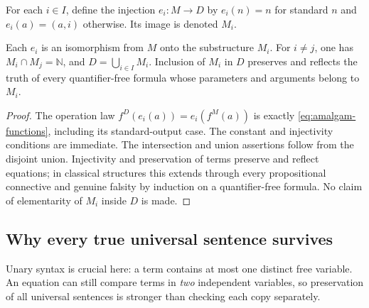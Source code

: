For each $i\in I$, define the injection
$e_i:M\to D$ by $e_i(n)=n$ for standard $n$ and
$e_i(a)=(a,i)$ otherwise. Its image is denoted $M_i$.

\begin{lemma}
\label{lem:amalgam-copies}
Each $e_i$ is an isomorphism from $M$ onto the substructure $M_i$.
For $i\ne j$, one has $M_i\cap M_j=\mathbb N$, and
$D=\bigcup_{i\in I}M_i$. Inclusion of $M_i$ in $D$ preserves
and reflects the truth of every quantifier-free formula whose
parameters and arguments belong to $M_i$.
\end{lemma}
\begin{proof}
The operation law $f^D(e_i(a))=e_i(f^M(a))$ is exactly
\eqref{eq:amalgam-functions}, including its standard-output case.
The constant and injectivity conditions are immediate. The
intersection and union assertions follow from the disjoint union.
Injectivity and preservation of terms preserve and reflect equations;
in classical structures this extends through every propositional
connective and genuine falsity by induction on a quantifier-free
formula. No claim of elementarity of $M_i$ inside $D$ is made.
\end{proof}

\subsection{Why every true universal sentence survives}
\label{subsec:amalgam-universal}

Unary syntax is crucial here: a term contains at most one distinct
free variable. An equation can still compare terms in \emph{two}
independent variables, so preservation of all universal sentences is
stronger than checking each copy separately.

